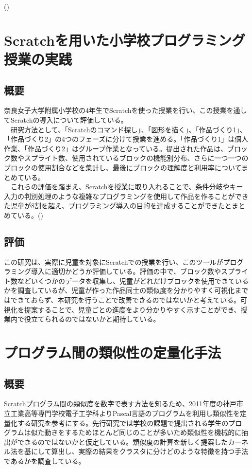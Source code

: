 \documentclass[a4paper,10pt,onecolumn,oneside,openany]{jsbook}
\begin{document}
 
(\cite{preEssay3})

\section{Scratchを用いた小学校プログラミング授業の実践}
\subsection{概要}
奈良女子大学附属小学校の4年生でScratchを使った授業を行い、この授業を通してScratchの導入について評価している。
\\
　研究方法として、「Scratchのコマンド探し」、「図形を描く」、「作品づくり1」、「作品づくり2」の4つのフェーズに分けて授業を進める。「作品づくり1」は個人作業、「作品づくり2」はグループ作業となっている。提出された作品は、ブロック数やスプライト数、使用されているブロックの機能別分布、さらに一つ一つのブロックの使用割合などを集計し、最後にブロックの理解度と利用率についてまとめている。
\\
　これらの評価を踏まえ、Scratchを授業に取り入れることで、条件分岐やキー入力の判別処理のような複雑なプログラミングを使用して作品を作ることができた児童が8割を超え、プログラミング導入の目的を達成することができたとまとめている。(\cite{preEssay1})

\subsection{評価}
この研究は、実際に児童を対象にScratchでの授業を行い、このツールがプログラミング導入に適切かどうか評価している。評価の中で、ブロック数やスプライト数などいくつかのデータを収集し、児童がどれだけブロックを使用できているかを調査しているが、児童が作った作品同士の類似度を分かりやすく可視化まではできておらず、本研究を行うことで改善できるのではないかと考えている。可視化を提案することで、児童ごとの進度をより分かりやすく示すことができ、授業内で役立てられるのではないかと期待している。
\section{プログラム間の類似性の定量化手法}
\subsection{概要}
Scratchプログラム間の類似度を数字で表す方法を知るため、2011年度の神戸市立工業高等専門学校電子工学科よりPascal言語のプログラムを利用し類似性を定量化する研究を参考にする。先行研究では学校の課題で提出される学生のプログラムは似た動きをするためほとんど同じのことが多いため類似性を機械的に抽出ができるのではないかと仮定している。類似度の計算を新しく提案したカーネル法を基にして算出し、実際の結果をクラスタに分けどのような特徴を持つ手法であるかを調査している。\cite{preEssay2}
\end{document}
